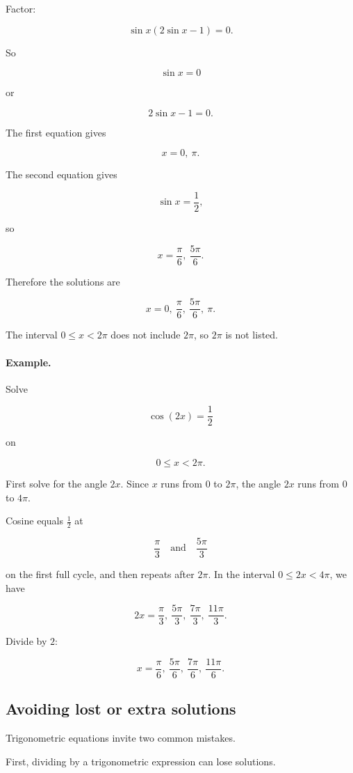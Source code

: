 Factor:

\[
\sin x(2\sin x-1)=0.
\]

So

\[
\sin x=0
\]

or

\[
2\sin x-1=0.
\]

The first equation gives

\[
x=0,\ \pi.
\]

The second equation gives

\[
\sin x=\frac12,
\]

so

\[
x=\frac{\pi}{6},\ \frac{5\pi}{6}.
\]

Therefore the solutions are

\[
\boxed{
x=0,\ \frac{\pi}{6},\ \frac{5\pi}{6},\ \pi.
}
\]

The interval \(0\le x<2\pi\) does not include \(2\pi\), so \(2\pi\) is not listed.

\paragraph{Example.}
Solve

\[
\cos(2x)=\frac12
\]

on

\[
0\le x<2\pi.
\]

First solve for the angle \(2x\).  Since \(x\) runs from \(0\) to \(2\pi\), the angle \(2x\)
runs from \(0\) to \(4\pi\).

Cosine equals \(\frac12\) at

\[
\frac{\pi}{3}
\quad\text{and}\quad
\frac{5\pi}{3}
\]

on the first full cycle, and then repeats after \(2\pi\).  In the interval \(0\le 2x<4\pi\),
we have

\[
2x=\frac{\pi}{3},\ \frac{5\pi}{3},\ \frac{7\pi}{3},\ \frac{11\pi}{3}.
\]

Divide by \(2\):

\[
\boxed{
x=\frac{\pi}{6},\ \frac{5\pi}{6},\ \frac{7\pi}{6},\ \frac{11\pi}{6}.
}
\]

\subsection{Avoiding lost or extra solutions}
\label{appsubsec:trig-equation-warnings}

Trigonometric equations invite two common mistakes.

First, dividing by a trigonometric expression can lose solutions.

